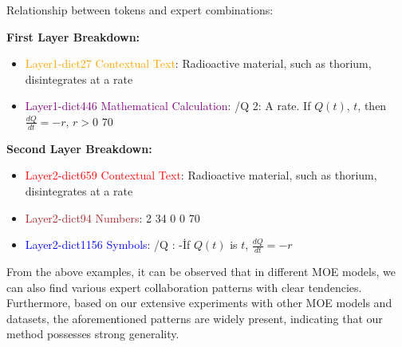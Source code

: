 \documentclass[11pt]{article}
\begin{document}
\bigskip

\noindent
{Relationship between tokens and expert combinations:}

 \textbf{First Layer Breakdown:}
    \begin{itemize}
        \item \textcolor{orange}{Layer1-dict27 Contextual Text}: Radioactive material, such as thorium, disintegrates at a rate
        \item \textcolor{purple}{Layer1-dict446 Mathematical Calculation}: /Q 2: A rate. If $Q(t)$, $t$, then $\frac{dQ}{dt} = -r$,  $r > 0$ 70
    \end{itemize}
    
\textbf{Second Layer Breakdown:}
    \begin{itemize}
        \item \textcolor{red}{Layer2-dict659 Contextual Text}: Radioactive material, such as thorium, disintegrates at a rate
        \item \textcolor{brown}{Layer2-dict94 Numbers}: 2 34 0 0 70
        \item \textcolor{blue}{Layer2-dict1156 Symbols}: /Q : -\. If $Q(t)$ is $t$, $\frac{dQ}{dt} = -r$
    \end{itemize}

\bigskip

From the above examples, it can be observed that in different MOE models, we can also find various expert collaboration patterns with clear tendencies. Furthermore, based on our extensive experiments with other MOE models and datasets, the aforementioned patterns are widely present, indicating that our method possesses strong generality.
\end{document}
